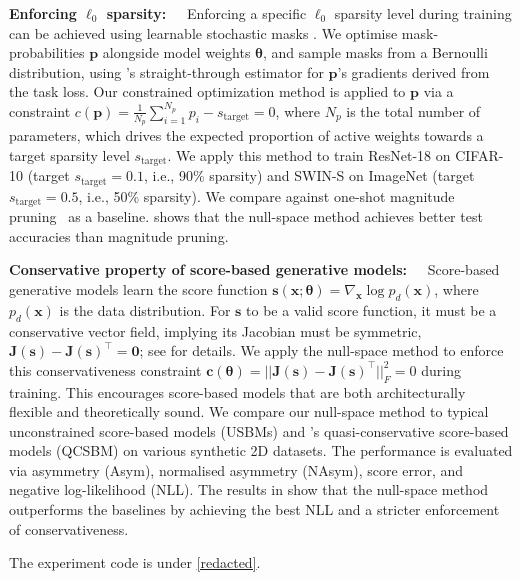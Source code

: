 \textbf{Enforcing $\ell_0$ sparsity:~~}
Enforcing a specific $\ell_0$ sparsity level during training can be achieved using learnable stochastic masks \citep{louizos2017learning, gallego2022controlled}. 
We optimise mask-probabilities $\mathbf{p}$ alongside model weights $\mathbf{\theta}$, and sample masks from a Bernoulli distribution, using \citet{yin2019understanding}'s straight-through estimator for $\mathbf{p}$'s gradients derived from the task loss. Our constrained optimization method is applied to $\mathbf{p}$ via a constraint $c(\mathbf{p}) = \frac{1}{N_p} \sum_{i=1}^{N_p} p_i - s_{\text{target}} = 0$, where $N_p$ is the total number of parameters, which drives the expected proportion of active weights towards a target sparsity level $s_{\text{target}}$.
We apply this method to train ResNet-18 \citep{he2016deep} on CIFAR-10 \citep{krizhevsky2009learning} (target $s_{\text{target}}=0.1$, i.e., 90\% sparsity) and SWIN-S \citep{liu2021swin} on ImageNet \citep{deng2009imagenet, russakovsky2015imagenet} (target $s_{\text{target}}=0.5$, i.e., 50\% sparsity). We compare against one-shot magnitude pruning~\citep{lee2024jaxpruner} as a baseline.  shows that the null-space method achieves better test accuracies than magnitude pruning.

\textbf{Conservative property of score-based generative models:~~}
Score-based generative models learn the score function $\mathbf{s}(\mathbf{x}; \mathbf{\theta}) = \nabla_{\mathbf{x}} \log p_d(\mathbf{x})$, where $p_d(\mathbf{x})$ is the data distribution. For $\mathbf{s}$ to be a valid score function, it must be a conservative vector field, implying its Jacobian must be symmetric, $\mathbf{J}(\mathbf{s}) - \mathbf{J}(\mathbf{s})^\top = \mathbf{0}$; see \citep{chao2022investigating} for details. We apply the null-space method to enforce this conservativeness constraint $\mathbf{c}(\mathbf{\theta}) = ||\mathbf{J}(\mathbf{s}) - \mathbf{J}(\mathbf{s})^\top||_F^2 = 0$ during training. This encourages score-based models that are both architecturally flexible and theoretically sound.
We compare our null-space method to typical unconstrained score-based models (USBMs) and \citet{chao2022investigating}'s quasi-conservative score-based models (QCSBM) on various synthetic 2D datasets. The performance is evaluated via asymmetry (Asym), normalised asymmetry (NAsym), score error, and negative log-likelihood (NLL). The results in  show that the null-space method outperforms the baselines by achieving the best NLL and a stricter enforcement of conservativeness.

The experiment code is under  \url{[redacted]}.


